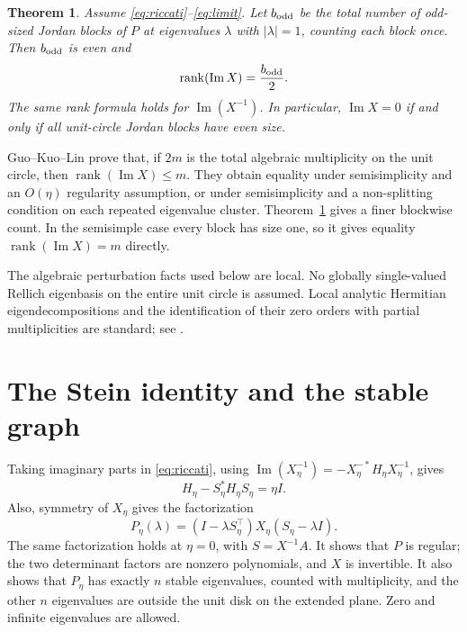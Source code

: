 \documentclass[11pt]{article}
\newtheorem{theorem}{Theorem}
\newcommand{\Ima}{\operatorname{Im}}
\newcommand{\rank}{\operatorname{rank}}
\begin{document}
\begin{theorem}\label{thm:main}
Assume \eqref{eq:riccati}--\eqref{eq:limit}.
Let $b_{\rm odd}$ be the total number of odd-sized Jordan blocks of $P$ at eigenvalues
$\lambda$ with $|\lambda|=1$, counting each block once.
Then $b_{\rm odd}$ is even and
\begin{equation}\label{eq:rank}
\rank(\Ima X)=\frac{b_{\rm odd}}2.
\end{equation}
The same rank formula holds for $\Ima(X^{-1})$.
In particular, $\Ima X=0$ if and only if all unit-circle Jordan blocks have even size.
\end{theorem}

Guo--Kuo--Lin \cite[Theorem~3.3]{GKL} prove that, if $2m$ is the total algebraic
multiplicity on the unit circle, then $\rank(\Ima X)\le m$.
They obtain equality under semisimplicity and an $O(\eta)$ regularity assumption,
or under semisimplicity and a non-splitting condition on each repeated eigenvalue cluster.
Theorem~\ref{thm:main} gives a finer blockwise count. In the semisimple case every block
has size one, so it gives equality $\rank(\Ima X)=m$ directly.

The algebraic perturbation facts used below are local. No globally single-valued Rellich
eigenbasis on the entire unit circle is assumed. Local analytic Hermitian eigendecompositions
and the identification of their zero orders with partial multiplicities are standard;
see \cite[Theorem~1.1 and Section~5]{BN}.

\section{The Stein identity and the stable graph}
Taking imaginary parts in \eqref{eq:riccati}, using
$\Ima(X_\eta^{-1})=-X_\eta^{-*}H_\eta X_\eta^{-1}$, gives
\begin{equation}\label{eq:Stein}
H_\eta-S_\eta^*H_\eta S_\eta=\eta I.
\end{equation}
Also, symmetry of $X_\eta$ gives the factorization
\begin{equation}\label{eq:factor}
P_\eta(\lambda)=(I-\lambda S_\eta^\top)X_\eta(S_\eta-\lambda I).
\end{equation}
The same factorization holds at $\eta=0$, with $S=X^{-1}A$.
It shows that $P$ is regular; the two determinant factors are nonzero polynomials,
and $X$ is invertible. It also shows that $P_\eta$ has exactly $n$ stable eigenvalues,
counted with multiplicity, and the other $n$ eigenvalues are outside the unit disk
on the extended plane. Zero and infinite eigenvalues are allowed.
\end{document}
